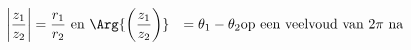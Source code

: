 \begin{align}
\left| \frac{z_1}{z_2} \right| &= \frac{r_1}{r_2}    \text{~en~}
\Arg{\left( \frac{z_1}{z_2} \right)} &= \theta_1 - \theta_2  \text{op een
  veelvoud van $2\pi$ na}
\end{align}
